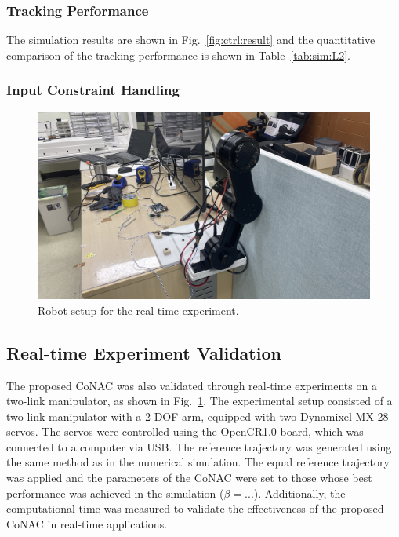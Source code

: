 \documentclass[final,5p,times,twocolumn,authoryear]{elsarticle}
\newcommand*{\figSizeOneCol}{0.98}
\begin{document}
\subsubsection{Tracking Performance}

The simulation results are shown in Fig.~\ref{fig:ctrl:result} and the quantitative comparison of the tracking performance is shown in Table~\ref{tab:sim:L2}.

\subsubsection{Input Constraint Handling}


\begin{figure}[t]
    \centering
        \includegraphics[width=\figSizeOneCol\linewidth]
        {
            fig/exp_set.jpg
        }%
    \caption{
        Robot setup for the real-time experiment.
    }
    \label{fig:ctrl:exp:set}
  \end{figure}


\subsection{Real-time Experiment Validation}

The proposed CoNAC was also validated through real-time experiments on a two-link manipulator, as shown in Fig.~\ref{fig:ctrl:exp:set}. 
\color{red}
The experimental setup consisted of a two-link manipulator with a 2-DOF arm, equipped with two Dynamixel MX-28 servos. The servos were controlled using the OpenCR1.0 board, which was connected to a computer via USB. The reference trajectory was generated using the same method as in the numerical simulation.
\color{black}
The equal reference trajectory was applied and the parameters of the CoNAC were set to those whose best performance was achieved in the simulation (\ie $\beta=...$).
Additionally, the computational time was measured to validate the effectiveness of the proposed CoNAC in real-time applications.
\end{document}
